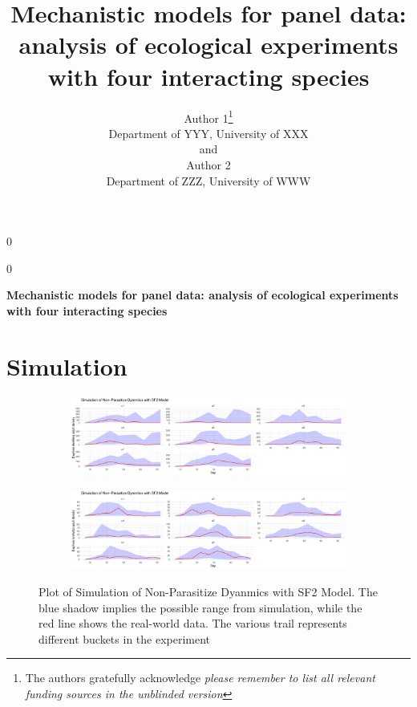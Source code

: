 \documentclass[12pt]{article}
\newcommand{\blind}{0}
\begin{document}

\def\spacingset#1{\renewcommand{\baselinestretch}%
{#1}\small\normalsize} \spacingset{1}


\blind
{
  \title{\bf Mechanistic models for panel data: analysis of ecological experiments with four interacting species}
  \author{Author 1\thanks{
    The authors gratefully acknowledge \textit{please remember to list all relevant funding sources in the unblinded version}}\hspace{.2cm}\\
    Department of YYY, University of XXX\\
    and \\
    Author 2 \\
    Department of ZZZ, University of WWW}
  \maketitle
} \fi

\blind
{
  \bigskip
  \bigskip
  \bigskip
  \begin{center}
    {\LARGE\bf Mechanistic models for panel data: analysis of ecological experiments with four interacting species}
\end{center}
  \medskip
} \fi

\bigskip


\section{Simulation}
\label{sec:sim}
\begin{figure}[H]
\centering
\begin{subfigure}[b]{\linewidth}
\includegraphics{si-002}
\end{subfigure}
\begin{subfigure}[b]{\linewidth}
\includegraphics{si-003}
\end{subfigure}%
\caption{Plot of Simulation of Non-Parasitize Dyanmics with SF2 Model. The blue shadow implies the possible range from simulation, while the red line shows the real-world data. The various trail represents different buckets in the experiment}
\end{figure}
\end{document}
